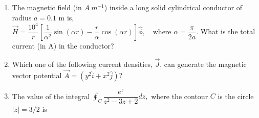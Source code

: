 \documentclass[14pt, a4paper]{extarticle}
\begin{document}
\begin{enumerate}[label=\textbf{Q. \arabic*}, start=21]

\item The magnetic field (in $A~m^{-1}$) inside a long solid cylindrical conductor of radius $a = 0.1$ m is,
$ \vec{H} = \dfrac{10^4}{r} \left[ \dfrac{1}{\alpha^2}\sin(\alpha r) - \dfrac{r}{\alpha}\cos(\alpha r) \right] \hat{\phi}, \quad \text{where } \alpha = \dfrac{\pi}{2a}. $
What is the total current (in A) in the conductor?
\begin{enumerate}[label=(\Alph*)]
\end{enumerate}

\item Which one of the following current densities, $\vec{J}$, can generate the magnetic vector potential $\vec{A} = (y^2\hat{i} + x^2\hat{j})$?
\begin{enumerate}[label=(\Alph*)]
\end{enumerate}

\item The value of the integral $\oint_C \dfrac{e^z}{z^2 - 3z + 2} dz,$
where the contour $C$ is the circle $|z| = 3/2$ is
\begin{enumerate}[label=(\Alph*)]
\end{enumerate}


\end{enumerate}
\end{document}
